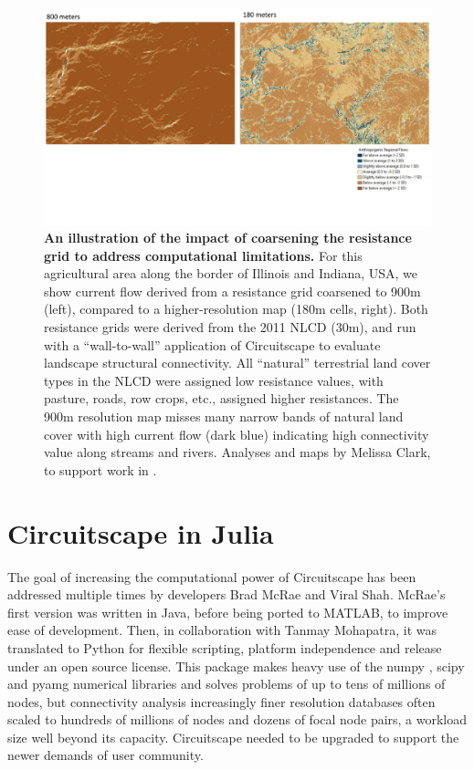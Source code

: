 \documentclass{juliacon}
\begin{document}
\begin{figure}
    \centering
    \includegraphics[width=\textwidth]{res.pdf}
    \caption{\textbf{An illustration of the impact of coarsening the resistance grid to address computational limitations.}  For this agricultural area along the border of Illinois and Indiana, USA, we show current flow derived from a resistance grid coarsened to 900m (left), compared to a higher-resolution map (180m cells, right).  Both resistance grids were derived from the 2011 NLCD (30m), and run with a “wall-to-wall” application of Circuitscape to evaluate landscape structural connectivity.  All “natural” terrestrial land cover types in the NLCD were assigned low resistance values, with pasture, roads, row crops, etc., assigned higher resistances. The 900m resolution map misses many narrow bands of natural land cover with high current flow (dark blue) indicating high connectivity value along streams and rivers. Analyses and maps by Melissa Clark, to support work in \cite{baldwin2018future}. 
}
    \label{fig:my_label}
\end{figure}



\section{Circuitscape in Julia}
\label{sec:documentclass}
%
The goal of increasing the computational power of Circuitscape has been addressed multiple times by developers Brad McRae and Viral Shah.  McRae’s first version was written in Java, before being ported to MATLAB, to improve ease of development. Then, in collaboration with Tanmay Mohapatra, it was translated to Python for flexible scripting, platform independence and release under an open source license. This package makes heavy use of the numpy \cite{van2011numpy}, scipy \cite{jones2014scipy} and pyamg \cite{bell2015pyamg} numerical libraries and solves problems of up to tens of millions of nodes, but connectivity analysis increasingly finer resolution databases often scaled to hundreds of millions of nodes and dozens of focal node pairs, a workload size well beyond its capacity. Circuitscape needed to be upgraded to support the newer demands of user community. 
\end{document}
